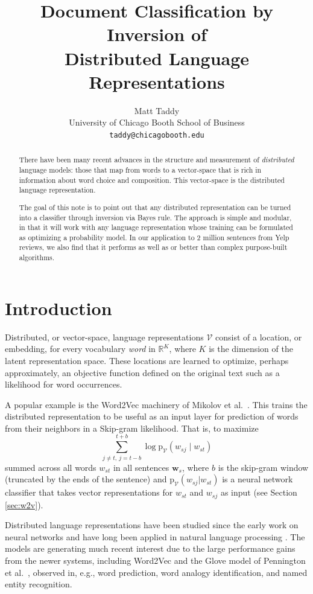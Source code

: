 \documentclass[11pt]{article}
\title{Document Classification by Inversion of \\Distributed Language Representations}
\author{Matt Taddy \\
  University of Chicago Booth School of Business \\
  {\tt taddy@chicagobooth.edu} \\}
\date{}
\begin{document}
\maketitle
\begin{abstract}
There have been many recent advances in the structure and measurement of {\it distributed} language models: those that map from words to a vector-space that is rich in information about word choice and composition.  This vector-space is the distributed language representation.


The goal of this note is to point out that any distributed  representation can be turned into a classifier through inversion via Bayes rule.  
The approach is simple and modular, in that it will work with any language representation whose training can be formulated as optimizing a probability model. In our application to 2 million sentences from Yelp reviews, we also find that it performs as well as or better than  complex purpose-built algorithms. \end{abstract}

\section{Introduction}

Distributed, or vector-space, language representations $\mathcal{V}$ consist
of a location, or embedding, for every vocabulary {\it word} in $\mathds{R}^K$, where
$K$ is the dimension of the latent representation space.  These locations
are learned to optimize, perhaps approximately, an objective function
defined on the original text such as a likelihood for word occurrences.

A popular example is the Word2Vec machinery of
Mikolov et al.~.  This trains the distributed
representation to be useful as an input layer for prediction of words from
their neighbors in a Skip-gram likelihood.  That is, to maximize
\begin{equation}\label{eq:skipgram}
\sum_{j\neq t,~j=t-b}^{t+b} \log\mathrm{p}_{\mathcal{V}}(w_{sj}\mid w_{st})
\end{equation}
summed across all words $w_{st}$ in all sentences $\mathbf{w}_s$, where $b$ is
the skip-gram window (truncated by the ends of the
sentence) and  $\mathrm{p}_{\mathcal{V}}(w_{sj}| w_{st})$ is a neural network
classifier that takes vector representations for $w_{st}$ and $w_{sj}$
as input (see Section \ref{sec:w2v}).  

Distributed language representations have been studied since the early work on
neural networks \cite{rumelhart_learning_1986} and have long been applied in
natural language processing \cite{morin_hierarchical_2005}.  The models are
generating much recent interest due to the large performance gains from the
newer systems, including Word2Vec and the Glove model of Pennington et
al.~, observed in, e.g., word
prediction, word analogy identification, and named entity recognition.
\end{document}
